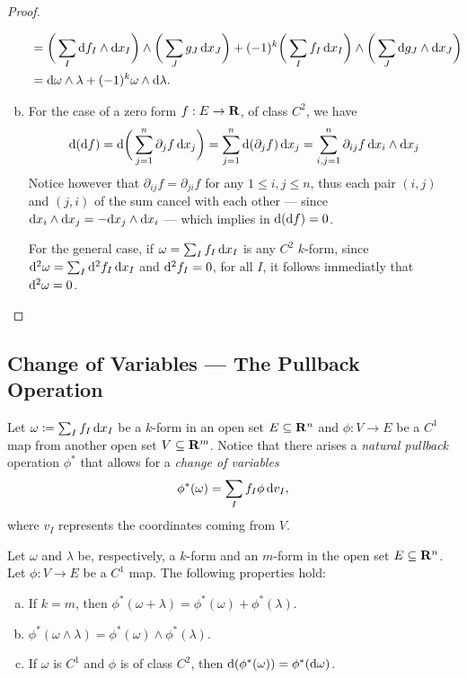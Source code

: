 \begin{proof}
\begin{enumerate}[(a)]
\begin{align*}
    &= \bigg( \sum_I \mathrm{d} f_I \wedge \mathrm{d} x_I\bigg) \wedge
      \bigg( \sum_J g_J\, \mathrm{d} x_J \bigg)
      + (-1)^k \bigg( \sum_I f_I\, \mathrm{d} x_I \bigg) \wedge
      \bigg( \sum_J \mathrm{d} g_J \wedge \mathrm{d} x_J \bigg) \\
    &= \mathrm{d} \omega \wedge \lambda + (-1)^k \omega \wedge \mathrm{d} \lambda.
  \end{align*}
\item For the case of a zero form \(f: E \to \mathbf{R}\), of class \(C^2\), we have
  \[
    \mathrm{d}(\mathrm{d} f) =
    \mathrm{d} \bigg( \sum_{j=1}^n \partial_j f\, \mathrm{d} x_j \bigg)
    = \sum_{j = 1}^n \mathrm{d} (\partial_j f)\, \mathrm{d} x_j
    = \sum_{i, j = 1}^n \partial_{i j} f\, \mathrm{d} x_i \wedge \mathrm{d} x_j
  \]
  Notice however that \(\partial_{i j} f = \partial_{j i} f\) for any \(1 \leq
  i, j \leq n\), thus each pair \((i, j)\) and \((j, i)\) of the sum cancel with
  each other --- since \(\mathrm{d} x_i \wedge \mathrm{d} x_j = - \mathrm{d} x_j \wedge \mathrm{d}
  x_i\) --- which implies in \(\mathrm{d}(\mathrm{d} f) = 0\).

  For the general case, if \(\omega = \sum_I f_I\, \mathrm{d} x_I\) is any \(C^2\)
  \(k\)-form, since \(\mathrm{d}^2 \omega = \sum_I \mathrm{d}^2 f_I\, \mathrm{d} x_I\) and
  \(\mathrm{d}^2 f_I = 0\), for all \(I\), it follows immediatly that \(\mathrm{d}^2
  \omega = 0\).
\end{enumerate}
\end{proof}

\subsection{Change of Variables --- The Pullback Operation}

Let \(\omega \coloneq \sum_I f_I\, \mathrm{d} x_I\) be a \(k\)-form in an open set
\(E \subseteq \mathbf{R}^n\) and \(\phi: V \to E\) be a \(C^1\) map from another open
set \(V \subseteq \mathbf{R}^m\). Notice that there arises a \emph{natural pullback}
operation \(\phi^{*}\) that allows for a \emph{change of variables}
\begin{equation}
\label{eq:change-of-variables-forms}
  \phi^{*}(\omega) = \sum_I f_I \phi\, \mathrm{d} v_I,
\end{equation}
where \(v_I\) represents the coordinates coming from \(V\).

\begin{proposition}
\label{prop:algebraic-properties-pullback-forms}
Let \(\omega\) and \(\lambda\) be, respectively, a \(k\)-form and an \(m\)-form
in the open set \(E \subseteq \mathbf{R}^n\). Let \(\phi: V \to E\) be a \(C^{1}\)
map. The following properties hold:
\begin{enumerate}[(a)]\setlength\itemsep{0em}
\item If \(k = m\), then \(\phi^{*}(\omega + \lambda) = \phi^{*}(\omega) +
  \phi^{*}(\lambda)\).
\item \(\phi^{*}(\omega \wedge \lambda) = \phi^{*}(\omega) \wedge \phi^{*}
  (\lambda)\).
\item If \(\omega\) is \(C^{1}\) and \(\phi\) is of class \(C^2\), then
  \(\mathrm{d}(\phi^{*}(\omega)) = \phi^{*}(\mathrm{d} \omega)\).
\end{enumerate}
\end{proposition}

